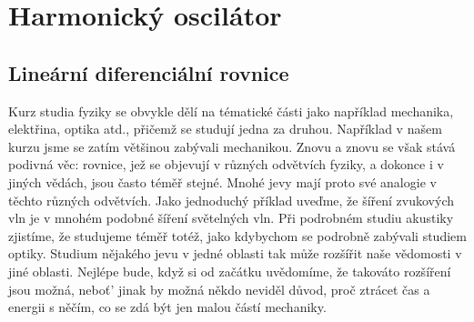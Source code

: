 \setchaptertoc
\chapter{Harmonický oscilátor}\label{fyz:IchapXXI}
  \section{Lineární diferenciální rovnice}\label{fyz:IchapXXIsecI}
    Kurz studia fyziky se obvykle dělí na tématické části jako například mechanika, elektřina,
    optika atd., přičemž se studují jedna za druhou. Například v našem kurzu jsme se zatím většinou
    zabývali mechanikou. Znovu a znovu se však stává podivná věc: rovnice, jež se objevují v různých
    odvětvích fyziky, a dokonce i v jiných vědách, jsou často téměř stejné. Mnohé jevy mají proto
    své analogie v těchto různých odvětvích. Jako jednoduchý příklad uveďme, že šíření zvukových vln
    je v mnohém podobné šíření světelných vln. Při podrobném studiu akustiky zjistíme, že studujeme
    téměř totéž, jako kdybychom se podrobně zabývali studiem optiky. Studium nějakého jevu v jedné
    oblasti tak může rozšířit naše vědomosti v jiné oblasti. Nejlépe bude, když si od začátku
    uvědomíme, že takováto rozšíření jsou možná, neboť' jinak by možná někdo neviděl důvod, proč
    ztrácet čas a energii s něčím, co se zdá být jen malou částí mechaniky.
    
